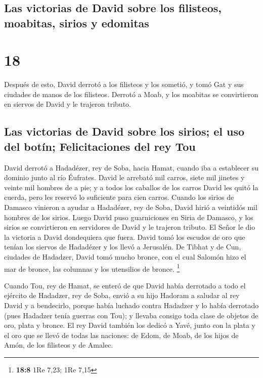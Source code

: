 \hypertarget{las-victorias-de-david-sobre-los-filisteos-moabitas-sirios-y-edomitas}{%
\subsection{Las victorias de David sobre los filisteos, moabitas, sirios
y
edomitas}\label{las-victorias-de-david-sobre-los-filisteos-moabitas-sirios-y-edomitas}}

\hypertarget{section-17}{%
\section{18}\label{section-17}}

 Después de esto, David derrotó a los filisteos y los
sometió, y tomó Gat y sus ciudades de manos de los filisteos.
 Derrotó a Moab, y los moabitas se convirtieron en siervos
de David y le trajeron tributo.

\hypertarget{las-victorias-de-david-sobre-los-sirios-el-uso-del-botuxedn-felicitaciones-del-rey-tou}{%
\subsection{Las victorias de David sobre los sirios; el uso del botín;
Felicitaciones del rey
Tou}\label{las-victorias-de-david-sobre-los-sirios-el-uso-del-botuxedn-felicitaciones-del-rey-tou}}

 David derrotó a Hadadézer, rey de Soba, hacia Hamat,
cuando iba a establecer su dominio junto al río Éufrates. 
David le arrebató mil carros, siete mil jinetes y veinte mil hombres de
a pie; y a todos los caballos de los carros David les quitó la cuerda,
pero les reservó lo suficiente para cien carros.  Cuando
los sirios de Damasco vinieron a ayudar a Hadadézer, rey de Soba, David
hirió a veintidós mil hombres de los sirios.  Luego David
puso guarniciones en Siria de Damasco, y los sirios se convirtieron en
servidores de David y le trajeron tributo. El Señor le dio la victoria a
David dondequiera que fuera.  David tomó los escudos de
oro que tenían los siervos de Hadadézer y los llevó a Jerusalén.
 De Tibhat y de Cun, ciudades de Hadadzer, David tomó
mucho bronce, con el cual Salomón hizo el mar de bronce, las columnas y
los utensilios de bronce. \footnote{\textbf{18:8} 1Re 7,23; 1Re 7,15}

 Cuando Tou, rey de Hamat, se enteró de que David había
derrotado a todo el ejército de Hadadzer, rey de Soba, 
envió a su hijo Hadoram a saludar al rey David y a bendecirlo, porque
había luchado contra Hadadzer y lo había derrotado (pues Hadadzer tenía
guerras con Tou); y llevaba consigo toda clase de objetos de oro, plata
y bronce.  El rey David también los dedicó a Yavé, junto
con la plata y el oro que se llevó de todas las naciones: de Edom, de
Moab, de los hijos de Amón, de los filisteos y de Amalec.

